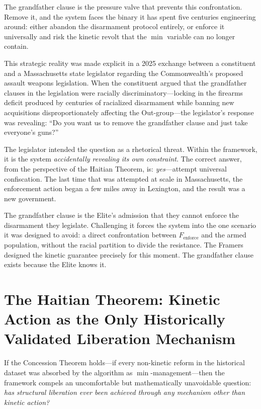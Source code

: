 \documentclass[12pt,openany]{book}
\begin{document}
The grandfather clause is the pressure valve that prevents this confrontation. Remove it, and the system faces the binary it has spent five centuries engineering around: either abandon the disarmament protocol entirely, or enforce it universally and risk the kinetic revolt that the $\min$ variable can no longer contain.

This strategic reality was made explicit in a 2025 exchange between a constituent and a Massachusetts state legislator regarding the Commonwealth's proposed assault weapons legislation. When the constituent argued that the grandfather clauses in the legislation were racially discriminatory---locking in the firearms deficit produced by centuries of racialized disarmament while banning new acquisitions disproportionately affecting the Out-group---the legislator's response was revealing: ``Do you want us to remove the grandfather clause and just take everyone's guns?''

The legislator intended the question as a rhetorical threat. Within the framework, it is the system \textit{accidentally revealing its own constraint}. The correct answer, from the perspective of the Haitian Theorem, is: \textit{yes}---attempt universal confiscation. The last time that was attempted at scale in Massachusetts, the enforcement action began a few miles away in Lexington, and the result was a new government.

The grandfather clause is the Elite's admission that they cannot enforce the disarmament they legislate. Challenging it forces the system into the one scenario it was designed to avoid: a direct confrontation between $F_{\text{enforce}}$ and the armed population, without the racial partition to divide the resistance. The Framers designed the kinetic guarantee precisely for this moment. The grandfather clause exists because the Elite knows it.

\section{The Haitian Theorem: Kinetic Action as the Only Historically Validated Liberation Mechanism}

If the Concession Theorem holds---if every non-kinetic reform in the historical dataset was absorbed by the algorithm as $\min$-management---then the framework compels an uncomfortable but mathematically unavoidable question: \textit{has structural liberation ever been achieved through any mechanism other than kinetic action?}
\end{document}
